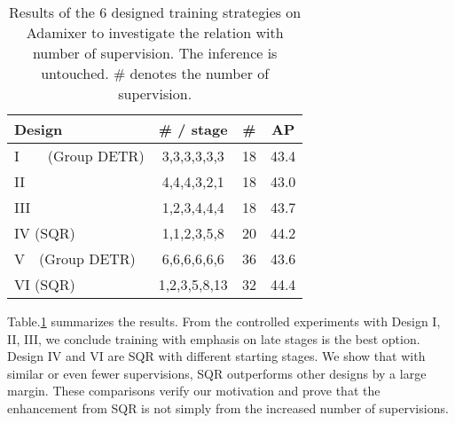 \documentclass[10pt,twocolumn,letterpaper]{article}
\begin{document}
\begin{table}[t!]
\centering
    \begin{tabular}{l|c|c|c}
    \toprule[1pt]
        Design &  \# / stage & \# & AP \\ \midrule
        I~~~~(Group DETR) & 3,3,3,3,3,3 & 18 & 43.4 \\ 
        II & 4,4,4,3,2,1 & 18 & 43.0 \\ 
        III & 1,2,3,4,4,4 & 18 & 43.7 \\ 
        IV (SQR) & 1,1,2,3,5,8 & 20 & 44.2 \\ 
        \midrule
        V~~(Group DETR) & 6,6,6,6,6,6 & 36 & 43.6 \\ 
        VI (SQR)& 1,2,3,5,8,13& 32 & 44.4 \\ 
       \bottomrule
    \end{tabular}
    \caption{Results of the 6 designed training strategies on Adamixer to investigate the relation with number of supervision. The inference is untouched. \# denotes the number of supervision.}
    \label{tab:num_supervision}
\end{table}





Table.\ref{tab:num_supervision} summarizes the results. From the controlled experiments with Design I, II, III, we conclude training with emphasis on late stages is the best option. Design IV and VI are SQR with different starting stages.  We show that with similar or even fewer supervisions, SQR outperforms other designs by a large margin. These comparisons verify our motivation and prove that the enhancement from SQR is not simply from the increased number of supervisions. 
\end{document}
